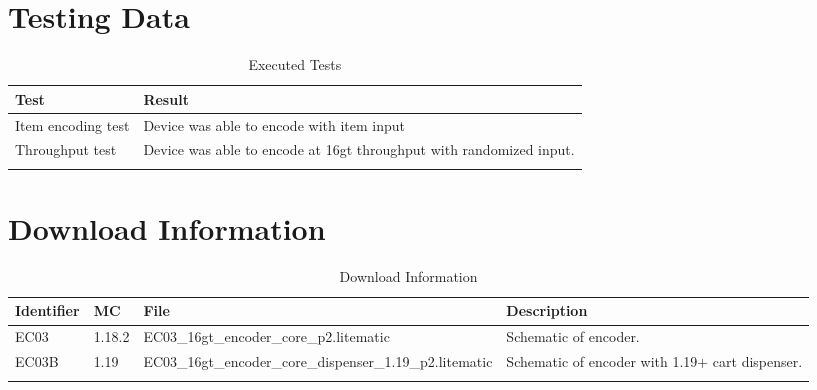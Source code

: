 \documentclass[10pt]{datasheet}
\begin{document}
\section{Testing Data}
\begin{table}[h]
\caption{Executed Tests}
\begin{tabularx}{\textwidth}{l | X}
    \thickhline
    \textbf{Test} & \textbf{Result} \\
    \hline
    Item encoding test & Device was able to encode with item input \\
    \hline
    Throughput test & Device was able to encode at 16gt throughput with randomized input. \\
    \thickhline
\end{tabularx}
\end{table}

\section{Download Information}
\begin{table}[h]
    \caption{Download Information}
    \begin{tabularx}{\textwidth}{l | l | l | X}
        \thickhline
        \textbf{Identifier} & \textbf{MC} & \textbf{File} & \textbf{Description} \\
        \hline
        EC03 & 1.18.2 & EC03\_16gt\_encoder\_core\_p2.litematic & Schematic of encoder. \\
        \hline
        EC03B & 1.19 & EC03\_16gt\_encoder\_core\_dispenser\_1.19\_p2.litematic & Schematic of encoder with 1.19+ cart dispenser. \\
        \thickhline
    \end{tabularx}
\end{table}
\end{document}
